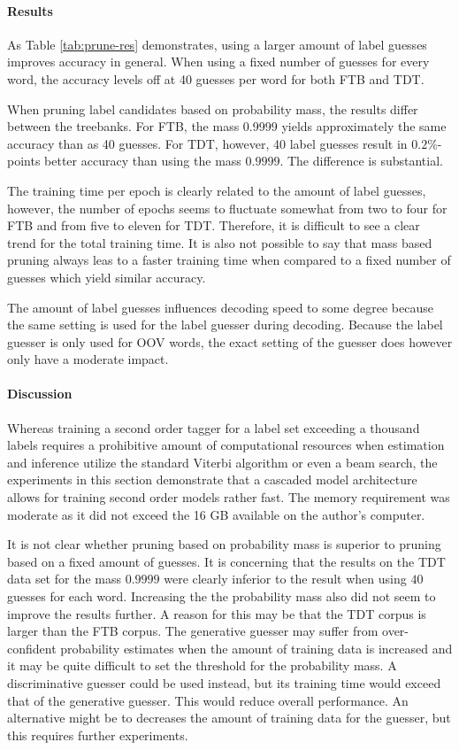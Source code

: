 \paragraph{Results} As Table \ref{tab:prune-res} demonstrates, using a
larger amount of label guesses improves accuracy in general. When
using a fixed number of guesses for every word, the accuracy levels
off at 40 guesses per word for both FTB and TDT.

When pruning label candidates based on probability mass, the results
differ between the treebanks. For FTB, the mass 0.9999 yields
approximately the same accuracy than as 40 guesses. For TDT, however,
40 label guesses result in $0.2\%$-points better accuracy than using
the mass $0.9999$. The difference is substantial.

The training time per epoch is clearly related to the amount of label
guesses, however, the number of epochs seems to fluctuate somewhat
from two to four for FTB and from five to eleven for TDT. Therefore,
it is difficult to see a clear trend for the total training time. It
is also not possible to say that mass based pruning always leas to a
faster training time when compared to a fixed number of guesses which
yield similar accuracy.

The amount of label guesses influences decoding speed to some degree
because the same setting is used for the label guesser during
decoding. Because the label guesser is only used for OOV words, the
exact setting of the guesser does however only have a moderate impact.

\paragraph{Discussion} Whereas training a second order tagger for a
label set exceeding a thousand labels requires a prohibitive amount of
computational resources when estimation and inference utilize the
standard Viterbi algorithm or even a beam search, the experiments in
this section demonstrate that a cascaded model architecture allows for
training second order models rather fast. The memory requirement was
moderate as it did not exceed the 16 GB available on the author's
computer.

It is not clear whether pruning based on probability mass is superior
to pruning based on a fixed amount of guesses. It is concerning that
the results on the TDT data set for the mass $0.9999$ were clearly
inferior to the result when using $40$ guesses for each
word. Increasing the the probability mass also did not seem to improve
the results further. A reason for this may be that the TDT corpus is
larger than the FTB corpus. The generative guesser may suffer from
over-confident probability estimates when the amount of training data
is increased and it may be quite difficult to set the threshold for
the probability mass. A discriminative guesser could be used instead,
but its training time would exceed that of the generative
guesser. This would reduce overall performance. An alternative might
be to decreases the amount of training data for the guesser, but this
requires further experiments.

